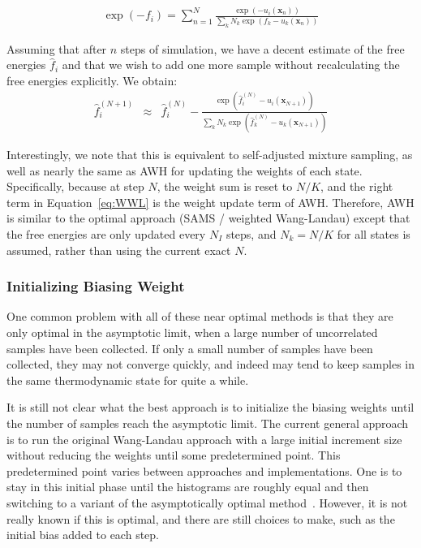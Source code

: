 \documentclass[9pt,review]{livecoms}
\newcommand{\vx}{\mathbf{x}}
\begin{document}
\begin{eqnarray}
\exp(-f_i) = \sum_{n=1}^N \frac{\exp(-u_i(\vx_n))}{\sum_k N_k \exp(f_k-u_k(\vx_n))}
\label{eq:MBARwl}
\end{eqnarray}

Assuming that after $n$ steps of simulation, we have a decent estimate of the free energies $\hat{f}_{i}$ and that we wish to add one more sample without recalculating the free energies explicitly. We obtain:
\begin{eqnarray}
\hat{f}_{i}^{(N+1)} &\approx& \hat{f}_{i}^{(N)}- \frac{\exp(\hat{f}_{i}^{(N)}-u_i(\vx_{N+1}))}{\sum_k N_k \exp(\hat{f}_{k}^{(N)}-u_k(\vx_{N+1}))}
\label{eq:WWL}
\end{eqnarray}

Interestingly, we note that this is equivalent to self-adjusted mixture sampling, as well as nearly the same as AWH for updating the weights of each state. Specifically, because at step $N$, the weight sum is reset to $N/K$, and the right term in Equation~\ref{eq:WWL} is the weight update term of AWH. Therefore, AWH is similar to the
optimal approach (SAMS / weighted Wang-Landau) except that the free energies are only updated every
$N_I$ steps, and $N_k = N/K$ for all states is assumed, rather than using the current exact $N$.

\subsubsection{Initializing Biasing Weight}

One common problem with all of these near optimal methods is that they are only optimal in the asymptotic limit, when a large number of uncorrelated samples have been collected.  If only a small number of samples have been collected, they may not converge quickly, and indeed may tend to keep samples in the same thermodynamic state for quite a while.

It is still not clear what the best approach is to initialize the biasing weights until the number of samples reach the asymptotic limit.  The current general approach is to run the original Wang-Landau approach with a large initial increment size without reducing the weights until some predetermined point. This predetermined point varies between approaches and implementations.  One is to stay in this initial phase until the histograms are roughly equal and then switching to a variant of the asymptotically optimal method~\cite{tan_optimally_2017}. However, it is not really known if this is optimal, and there are still choices to make, such as the initial bias added to each step.
\end{document}
